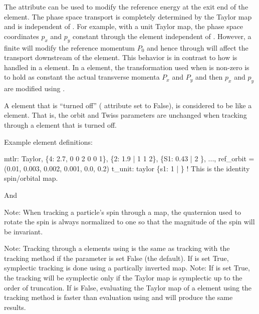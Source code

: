 {The  attribute can be used to modify the reference energy at the exit end of the
 element. The phase space transport is completely determined by the Taylor map and is
independent of . For example, with a unit Taylor map, the phase space coordinates
$p_x$ and $p_y$ constant through the element independent of . However, a finite
 will modify the reference momentum $P_0$ and hence through  will affect the
transport downstream of the  element. This behavior is in contrast to how
 is handled in a  element. In a  element, the transformation
used when  is non-zero is to hold as constant the actual transverse momenta $P_x$
and $P_y$ and then $p_x$ and $p_y$ are modified using .

A  element that is ``turned off'' ( attribute set to False), is
considered to be like a  element. That is, the orbit and Twiss parameters are
unchanged when tracking through a  element that is turned off.

Example  element definitions:
\begin{example}
  mtlr: Taylor, \{4:  2.7, 0 0 2 0 0 1\}, \{2:  1.9 | 1 1 2\},
              \{S1: 0.43 | 2 \}, ..., 
              ref_orbit = (0.01, 0.003, 0.002, 0.001, 0.0, 0.2)
  t_unit: taylor \{s1: 1 | \}  ! This is the identity spin/orbital map.
\end{example}
And 

Note: When tracking a particle's spin through a map, the quaternion used to rotate the spin is
always normalized to one so that the magnitude of the spin will be invariant. 

Note: Tracking through a  elements using  is the same as tracking with
the  tracking method if the  parameter is set False (the default).  If
 is set True, symplectic tracking is done using a partically inverted map.  Note: If
 is set True, the tracking will be symplectic only if the Taylor map is symplectic
up to the order of truncation. If  is False, evaluating the Taylor map of a
 element using the  tracking method is faster than evaluation using
 and will produce the same results.

\newpage

}
